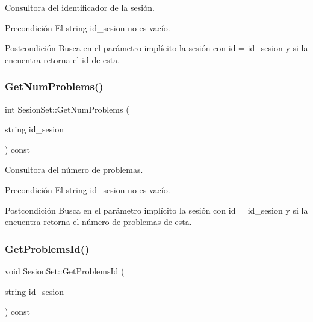 Consultora del identificador de la sesión. 

\begin{DoxyPrecond}{Precondición}
El string id\+\_\+sesion no es vacío. 
\end{DoxyPrecond}
\begin{DoxyPostcond}{Postcondición}
Busca en el parámetro implícito la sesión con id = id\+\_\+sesion y si la encuentra retorna el id de esta. 
\end{DoxyPostcond}
\mbox{\label{class_sesion_set_afeb85dad709e3fc5717e93c05a24bf8f}} 
\subsubsection{\texorpdfstring{Get\+Num\+Problems()}{GetNumProblems()}}
{\footnotesize\ttfamily int Sesion\+Set\+::\+Get\+Num\+Problems (\begin{DoxyParamCaption}\item[{string}]{id\+\_\+sesion }\end{DoxyParamCaption}) const}



Consultora del número de problemas. 

\begin{DoxyPrecond}{Precondición}
El string id\+\_\+sesion no es vacío. 
\end{DoxyPrecond}
\begin{DoxyPostcond}{Postcondición}
Busca en el parámetro implícito la sesión con id = id\+\_\+sesion y si la encuentra retorna el número de problemas de esta. 
\end{DoxyPostcond}
\mbox{\label{class_sesion_set_a40ab167ffeda96c90a899c669b7c8a7c}} 
\subsubsection{\texorpdfstring{Get\+Problems\+Id()}{GetProblemsId()}}
{\footnotesize\ttfamily void Sesion\+Set\+::\+Get\+Problems\+Id (\begin{DoxyParamCaption}\item[{string}]{id\+\_\+sesion }\end{DoxyParamCaption}) const}



